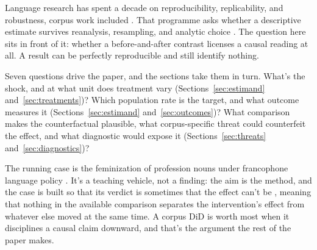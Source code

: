 Language research has spent a decade on reproducibility, replicability, and robustness, corpus work included \citep{SchweinbergerHaugh2025,Flanagan2025}. That programme asks whether a descriptive estimate survives reanalysis, resampling, and analytic choice \citep{EgbertBiberGrayLarsson2025,Sonning2024}. The question here sits in front of it: whether a before-and-after contrast licenses a causal reading at all. A result can be perfectly reproducible and still identify nothing.

Seven questions drive the paper, and the sections take them in turn. What's the shock, and at what unit does treatment vary (Sections~\ref{sec:estimand} and~\ref{sec:treatments})? Which population rate is the target, and what outcome measures it (Sections~\ref{sec:estimand} and~\ref{sec:outcomes})? What comparison makes the counterfactual plausible, what corpus-specific threat could counterfeit the effect, and what diagnostic would expose it (Sections~\ref{sec:threats} and~\ref{sec:diagnostics})?

The running case is the feminization of profession nouns under francophone language policy \citep{Fujimura2005,BurnettBonami2019}. It's a teaching vehicle, not a finding: the aim is the method, and the case is built so that its verdict is sometimes that the effect can't be , meaning that nothing in the available comparison separates the intervention's effect from whatever else moved at the same time. A corpus DiD is worth most when it disciplines a causal claim downward, and that's the argument the rest of the paper makes.
